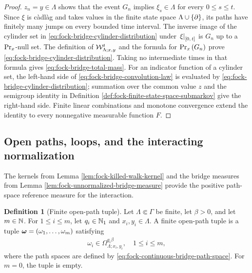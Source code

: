 \documentclass[11pt,a4paper]{article}
\theoremstyle{plain}
\theoremstyle{definition}
\newtheorem{defn}[thm]{Definition}
\theoremstyle{remark}
\begin{document}
\begin{proof}
$z_n=y\in\Lambda$ shows that the event $G_n$ implies
$\xi_s\in\Lambda$ for every $0\leq s\leq t$.
Since $\xi$ is càdlàg and takes values in the finite state space $\Lambda\cup\left\{ \partial \right\}$, its paths have
finitely many jumps on every bounded time interval.
The inverse image of the cylinder set in
\eqref{eq:fock-bridge-cylinder-distribution} under
$\left. \xi \right|_{\left[ 0,\,t \right]}$ is $G_n$ up to a $\mathrm{Pr}_x$-null set.
The definition of $\mathcal{W}_{\Lambda;x,y}^{t}$ and the formula for
$\mathrm{Pr}_x \left( G_n \right)$ prove
\eqref{eq:fock-bridge-cylinder-distribution}.
Taking no intermediate times in that formula gives \eqref{eq:fock-bridge-total-mass}.
For an indicator function of a cylinder set, the left-hand side of
\eqref{eq:fock-bridge-convolution-law} is evaluated by
\eqref{eq:fock-bridge-cylinder-distribution}; summation over the common value $z$ and the semigroup identity
in Definition \ref{def:fock-finite-state-space-submarkov} give the right-hand side.
Finite linear combinations and monotone convergence extend the identity to every nonnegative measurable
function $F$.
\end{proof}

\subsection{Open paths, loops, and the interacting normalization}\label{open-paths-loops-and-the-interacting-normalization}

The kernels from Lemma \ref{lem:fock-killed-walk-kernel} and the bridge measures from Lemma \ref{lem:fock-unnormalized-bridge-measure} provide the positive path-space reference measure for the interaction.

\begin{defn}[Finite open-path tuple]\label{def:fock-finite-open-path-tuple}
Let $\Lambda\Subset\Gamma$ be finite, let $\beta>0$, and let $m\in\mathbb{N}$.
For $1\leq i\leq m$, let $q_i\in\mathbb{N}_1$ and $x_i,y_i\in\Lambda$.
A finite open-path tuple is a tuple
$\boldsymbol{\omega}=\left( \omega_1,\ldots,\omega_m \right)$ satisfying
$$\begin{aligned}
\omega_i
\in
\Omega_{\Lambda;x_i,y_i}^{q_i\beta},
\quad
1\leq i\leq m,
\end{aligned}$$
where the path spaces are defined by \eqref{eq:fock-continuous-bridge-path-space}.
For $m=0$, the tuple is empty.
\end{defn}
\end{document}
